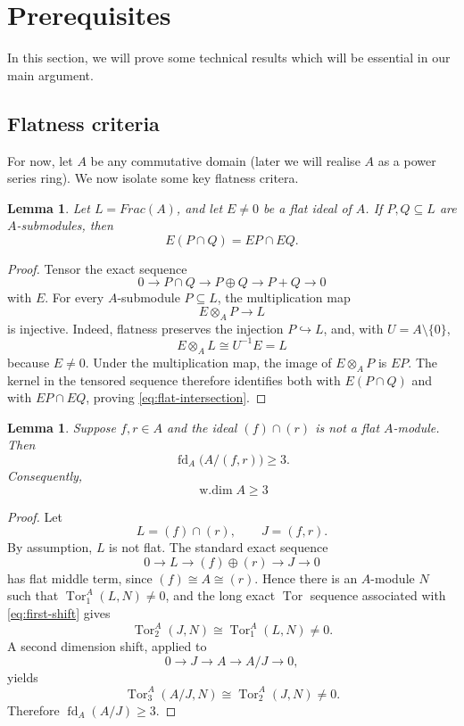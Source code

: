 \documentclass[12pt]{amsart}
\newtheorem{lemma}[theorem]{Lemma}
\theoremstyle{plain}
\newcommand{\wdim}{\operatorname{w.dim}}
\newcommand{\fd}{\operatorname{fd}}
\newcommand{\Tor}{\operatorname{Tor}}
\begin{document}
\section{Prerequisites}

\noindent In this section, we will prove some technical results which will be essential in our main argument.

\subsection{Flatness criteria}

For now, let $A$ be any commutative domain (later we will realise $A$ as a power series ring). We now isolate some key flatness critera.

\begin{lemma}\label{lem:flat-intersection}
Let $L=Frac(A)$, and let $E\neq 0$ be a flat
ideal of $A$. If $P,Q\subseteq L$ are $A$-submodules, then
\begin{equation}\label{eq:flat-intersection}
  E(P\cap Q)=EP\cap EQ.
\end{equation}
\end{lemma}

\begin{proof}
Tensor the exact sequence
\[
  0\longrightarrow P\cap Q
  \longrightarrow P\oplus Q
  \longrightarrow P+Q
  \longrightarrow0
\]
with $E$. For every $A$-submodule $P\subseteq L$, the multiplication
map
\[
  E\otimes_AP\longrightarrow L
\]
is injective. Indeed, flatness preserves the injection $P\hookrightarrow
L$, and, with $U=A\setminus\{0\}$,
\[
  E\otimes_AL\cong U^{-1}E=L
\]
because $E\neq 0$. Under the multiplication map, the image of
$E\otimes_AP$ is $EP$. The kernel in the tensored sequence therefore
identifies both with $E(P\cap Q)$ and with $EP\cap EQ$, proving
\eqref{eq:flat-intersection}.
\end{proof}

\begin{lemma}\label{thm:main}
Suppose $f,r\in A$ and the ideal $(f)\cap (r)$ is not a flat $A$-module. Then
\[
  \fd_A\bigl(A/(f,r)\bigr)\geq3.
\]
Consequently,
\begin{equation}\label{eq:strict-global}
  \wdim A\geq 3
\end{equation}
\end{lemma}

\begin{proof}
Let
\[
  L=(f)\cap(r),
  \qquad
  J=(f,r).
\]
By assumption, $L$ is not flat. The
standard exact sequence
\begin{equation}\label{eq:first-shift}
  0\longrightarrow L
  \longrightarrow(f)\oplus(r)
  \longrightarrow J
  \longrightarrow0
\end{equation}
has flat middle term, since $(f)\cong A\cong(r)$. Hence there is an
$A$-module $N$ such that $\Tor_1^A(L,N)\neq0$, and the long exact
$\Tor$ sequence associated with \eqref{eq:first-shift} gives
\[
  \Tor_2^A(J,N)\cong\Tor_1^A(L,N)\neq0.
\]
A second dimension shift, applied to
\[
  0\longrightarrow J\longrightarrow A
  \longrightarrow A/J\longrightarrow0,
\]
yields
\[
  \Tor_3^A(A/J,N)\cong\Tor_2^A(J,N)\neq0.
\]
Therefore $\fd_A(A/J)\geq3$.\end{proof}
\end{document}
